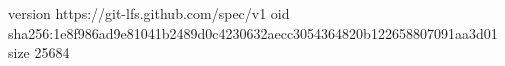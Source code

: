 version https://git-lfs.github.com/spec/v1
oid sha256:1e8f986ad9e81041b2489d0c4230632aecc3054364820b122658807091aa3d01
size 25684
